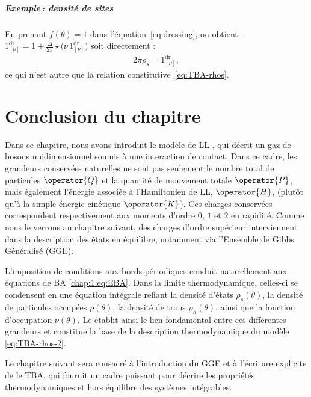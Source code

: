 \subparagraph{Exemple\,: densité de sites}

En prenant $f(\theta) = 1$ dans l’équation~\eqref{eq:dressing}, on obtient :
\(
1^{\mathrm{dr}}_{[\nu]}=1+\frac{\Delta}{2\pi}\star\bigl(\nu\,1^{\mathrm{dr}}_{[\nu]}\bigr)
\) soit directement : 
\begin{eqnarray}
	2\pi\rho_s = 1^{\mathrm{dr}}_{[\nu]},\label{eq:TBA-rhos-2}
\end{eqnarray}
ce qui n’est autre que la relation constitutive~\eqref{eq:TBA-rhos}.



\section*{Conclusion du chapitre}

Dans ce chapitre, nous avons introduit le modèle de \gls{LL} , qui décrit un gaz de bosons unidimensionnel soumis à une interaction de contact. Dans ce cadre, les grandeurs conservées naturelles ne sont pas seulement le nombre total de particules $\operator{Q}$ et la quantité de mouvement totale $\operator{P}$, mais également l’énergie associée à l’Hamiltonien de \gls{LL}, $\operator{H}$, (plutôt qu’à la simple énergie cinétique $\operator{K}$). Ces charges conservées correspondent respectivement aux moments d’ordre $0$, $1$ et $2$ en rapidité. Comme nous le verrons au chapitre suivant, des charges d’ordre supérieur interviennent dans la description des états en équilibre, notamment via l’Ensemble de Gibbs Généralisé (\gls{GGE}).

\medskip

L’imposition de conditions aux bords périodiques conduit naturellement aux équations de \gls{BA} \eqref{chap:1:eq:EBA}. Dans la limite thermodynamique, celles-ci se condensent en une équation intégrale reliant la densité d’états $\rho_s(\theta)$, la densité de particules occupées $\rho(\theta)$, la densité de trous $\rho_h(\theta)$, ainsi que la fonction d’occupation $\nu(\theta)$. Le  établit ainsi le lien fondamental entre ces différentes grandeurs et constitue la base de la description thermodynamique du modèle \eqref{eq:TBA-rhos-2}.

\medskip

Le chapitre suivant sera consacré à l’introduction du \gls{GGE} et à l’écriture explicite de le \gls{TBA}, qui fournit un cadre puissant pour décrire les propriétés thermodynamiques et hors équilibre des systèmes intégrables.




